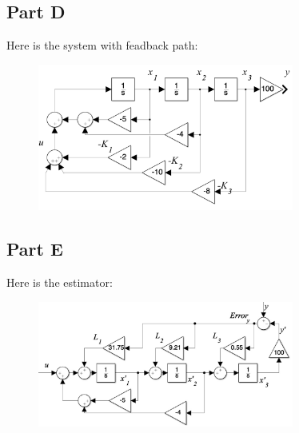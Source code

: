\documentclass[a4paper]{article}
\begin{document}
\subsection{Part D}
Here is the system with feadback path:
\begin{figure}[H]
\centering
\includegraphics[width = 0.75\textwidth]{pic/2.png}
\end{figure}

\subsection{Part E}
Here is the estimator:
\begin{figure}[H]
\centering
\includegraphics[width = 0.75\textwidth]{pic/3.png}
\end{figure}
\end{document}
